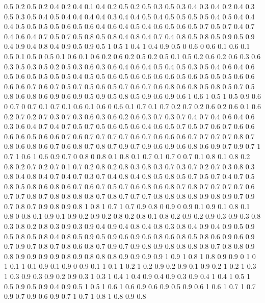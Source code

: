 0.5 0.2
0.5 0.2
0.4 0.2
0.4 0.1
0.4 0.2
0.5 0.2
0.5 0.3
0.5 0.3
0.4 0.3
0.4 0.2
0.4 0.3
0.5 0.3
0.5 0.4
0.5 0.4
0.4 0.4
0.4 0.3
0.4 0.4
0.5 0.4
0.5 0.5
0.5 0.5
0.4 0.5
0.4 0.4
0.4 0.5
0.5 0.5
0.5 0.6
0.5 0.6
0.4 0.6
0.4 0.5
0.4 0.6
0.5 0.6
0.5 0.7
0.5 0.7
0.4 0.7
0.4 0.6
0.4 0.7
0.5 0.7
0.5 0.8
0.5 0.8
0.4 0.8
0.4 0.7
0.4 0.8
0.5 0.8
0.5 0.9
0.5 0.9
0.4 0.9
0.4 0.8
0.4 0.9
0.5 0.9
0.5 1
0.5 1
0.4 1
0.4 0.9
0.5 0
0.6 0
0.6 0.1
0.6 0.1
0.5 0.1
0.5 0
0.5 0.1
0.6 0.1
0.6 0.2
0.6 0.2
0.5 0.2
0.5 0.1
0.5 0.2
0.6 0.2
0.6 0.3
0.6 0.3
0.5 0.3
0.5 0.2
0.5 0.3
0.6 0.3
0.6 0.4
0.6 0.4
0.5 0.4
0.5 0.3
0.5 0.4
0.6 0.4
0.6 0.5
0.6 0.5
0.5 0.5
0.5 0.4
0.5 0.5
0.6 0.5
0.6 0.6
0.6 0.6
0.5 0.6
0.5 0.5
0.5 0.6
0.6 0.6
0.6 0.7
0.6 0.7
0.5 0.7
0.5 0.6
0.5 0.7
0.6 0.7
0.6 0.8
0.6 0.8
0.5 0.8
0.5 0.7
0.5 0.8
0.6 0.8
0.6 0.9
0.6 0.9
0.5 0.9
0.5 0.8
0.5 0.9
0.6 0.9
0.6 1
0.6 1
0.5 1
0.5 0.9
0.6 0
0.7 0
0.7 0.1
0.7 0.1
0.6 0.1
0.6 0
0.6 0.1
0.7 0.1
0.7 0.2
0.7 0.2
0.6 0.2
0.6 0.1
0.6 0.2
0.7 0.2
0.7 0.3
0.7 0.3
0.6 0.3
0.6 0.2
0.6 0.3
0.7 0.3
0.7 0.4
0.7 0.4
0.6 0.4
0.6 0.3
0.6 0.4
0.7 0.4
0.7 0.5
0.7 0.5
0.6 0.5
0.6 0.4
0.6 0.5
0.7 0.5
0.7 0.6
0.7 0.6
0.6 0.6
0.6 0.5
0.6 0.6
0.7 0.6
0.7 0.7
0.7 0.7
0.6 0.7
0.6 0.6
0.6 0.7
0.7 0.7
0.7 0.8
0.7 0.8
0.6 0.8
0.6 0.7
0.6 0.8
0.7 0.8
0.7 0.9
0.7 0.9
0.6 0.9
0.6 0.8
0.6 0.9
0.7 0.9
0.7 1
0.7 1
0.6 1
0.6 0.9
0.7 0
0.8 0
0.8 0.1
0.8 0.1
0.7 0.1
0.7 0
0.7 0.1
0.8 0.1
0.8 0.2
0.8 0.2
0.7 0.2
0.7 0.1
0.7 0.2
0.8 0.2
0.8 0.3
0.8 0.3
0.7 0.3
0.7 0.2
0.7 0.3
0.8 0.3
0.8 0.4
0.8 0.4
0.7 0.4
0.7 0.3
0.7 0.4
0.8 0.4
0.8 0.5
0.8 0.5
0.7 0.5
0.7 0.4
0.7 0.5
0.8 0.5
0.8 0.6
0.8 0.6
0.7 0.6
0.7 0.5
0.7 0.6
0.8 0.6
0.8 0.7
0.8 0.7
0.7 0.7
0.7 0.6
0.7 0.7
0.8 0.7
0.8 0.8
0.8 0.8
0.7 0.8
0.7 0.7
0.7 0.8
0.8 0.8
0.8 0.9
0.8 0.9
0.7 0.9
0.7 0.8
0.7 0.9
0.8 0.9
0.8 1
0.8 1
0.7 1
0.7 0.9
0.8 0
0.9 0
0.9 0.1
0.9 0.1
0.8 0.1
0.8 0
0.8 0.1
0.9 0.1
0.9 0.2
0.9 0.2
0.8 0.2
0.8 0.1
0.8 0.2
0.9 0.2
0.9 0.3
0.9 0.3
0.8 0.3
0.8 0.2
0.8 0.3
0.9 0.3
0.9 0.4
0.9 0.4
0.8 0.4
0.8 0.3
0.8 0.4
0.9 0.4
0.9 0.5
0.9 0.5
0.8 0.5
0.8 0.4
0.8 0.5
0.9 0.5
0.9 0.6
0.9 0.6
0.8 0.6
0.8 0.5
0.8 0.6
0.9 0.6
0.9 0.7
0.9 0.7
0.8 0.7
0.8 0.6
0.8 0.7
0.9 0.7
0.9 0.8
0.9 0.8
0.8 0.8
0.8 0.7
0.8 0.8
0.9 0.8
0.9 0.9
0.9 0.9
0.8 0.9
0.8 0.8
0.8 0.9
0.9 0.9
0.9 1
0.9 1
0.8 1
0.8 0.9
0.9 0
1 0
1 0.1
1 0.1
0.9 0.1
0.9 0
0.9 0.1
1 0.1
1 0.2
1 0.2
0.9 0.2
0.9 0.1
0.9 0.2
1 0.2
1 0.3
1 0.3
0.9 0.3
0.9 0.2
0.9 0.3
1 0.3
1 0.4
1 0.4
0.9 0.4
0.9 0.3
0.9 0.4
1 0.4
1 0.5
1 0.5
0.9 0.5
0.9 0.4
0.9 0.5
1 0.5
1 0.6
1 0.6
0.9 0.6
0.9 0.5
0.9 0.6
1 0.6
1 0.7
1 0.7
0.9 0.7
0.9 0.6
0.9 0.7
1 0.7
1 0.8
1 0.8
0.9 0.8
